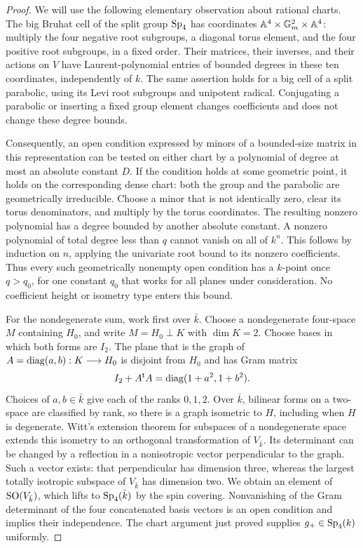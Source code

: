 \begin{proof}
We will use the following elementary observation about rational charts.
The big Bruhat cell of the split group $\operatorname{Sp}_4$ has coordinates
$\mathbb A^4\times\mathbb G_m^2\times\mathbb A^4$: multiply the four negative
root subgroups, a diagonal torus element, and the four positive root
subgroups, in a fixed order.  Their matrices, their inverses, and their
actions on $V$ have Laurent-polynomial entries of bounded degrees in
these ten coordinates, independently of $k$.  The same assertion holds
for a big cell of a split parabolic, using its Levi root subgroups and
unipotent radical.  Conjugating a parabolic or inserting a fixed group
element changes coefficients and does not change these degree bounds.

Consequently, an open condition expressed by minors of a bounded-size
matrix in this representation can be tested on either chart by a
polynomial of degree at most an absolute constant $D$.  If the condition
holds at some geometric point, it holds on the corresponding dense
chart: both the group and the parabolic are geometrically irreducible.
Choose a minor that is not identically zero, clear its torus
denominators, and multiply by the torus coordinates.  The resulting
nonzero polynomial has a degree bounded by another absolute constant.
A nonzero polynomial of total degree less than $q$ cannot vanish on
all of $k^n$.  This follows by induction on $n$, applying the univariate
root bound to its nonzero coefficients.  Thus every such geometrically
nonempty open condition has a $k$-point once $q>q_0$, for one constant
$q_0$ that works for all planes under consideration.  No coefficient
height or isometry type enters this bound.

For the nondegenerate sum, work first over $\bar k$.  Choose a
nondegenerate four-space $M$ containing $H_0$, and write
$M=H_0\perp K$ with $\dim K=2$.  Choose bases in which both forms
are $I_2$.  The plane that is the graph of
$A=\operatorname{diag}(a,b):K\longrightarrow H_0$ is disjoint from $H_0$ and has
Gram matrix
\[
 I_2+A^{\mathsf t}A=\operatorname{diag}(1+a^2,1+b^2).
\]
Choices of $a,b\in\bar k$ give each of the ranks $0,1,2$.  Over
$\bar k$, bilinear forms on a two-space are classified by rank, so
there is a graph isometric to $H$, including when $H$ is degenerate.
Witt's extension theorem for subspaces of a nondegenerate space extends
this isometry to an orthogonal transformation of $V_{\bar k}$.
Its determinant can be changed by a reflection in a nonisotropic vector
perpendicular to the graph.  Such a vector exists: that perpendicular
has dimension three, whereas the largest totally isotropic subspace of
$V_{\bar k}$ has dimension two.  We obtain an element of $\operatorname{SO}(V_{\bar
k})$, which lifts to $\operatorname{Sp}_4(\bar k)$ by the spin covering.
Nonvanishing of the Gram determinant of the four concatenated basis
vectors is an open condition and implies their independence.  The
chart argument just proved supplies $g_+\in\operatorname{Sp}_4(k)$ uniformly.


\end{proof}
